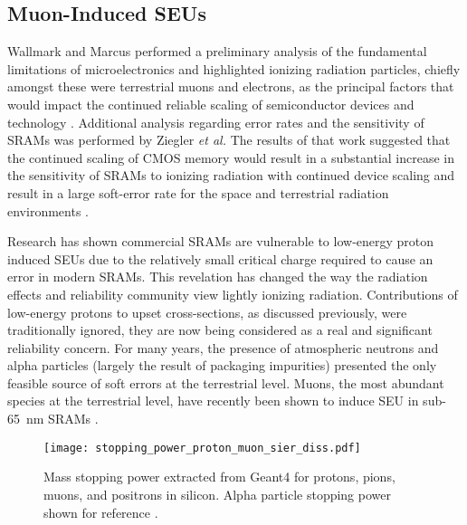 \subsection{Muon-Induced SEUs} %
\label{sub:muon_induced_seus}
Wallmark and Marcus performed a preliminary analysis of the fundamental limitations of microelectronics and highlighted ionizing radiation particles, chiefly amongst these were terrestrial muons and electrons, as the principal factors that would impact the continued reliable scaling of semiconductor devices and technology \cite{Wallmark:1962vn}.
Additional analysis regarding error rates and the sensitivity of SRAMs was performed by Ziegler \emph{et al.}
The results of that work suggested that the continued scaling of CMOS memory would result in a substantial increase in the sensitivity of SRAMs to ionizing radiation with continued device scaling and result in a large soft-error rate for the space and terrestrial radiation environments \cite{Ziegler:1979vh}.

Research has shown commercial SRAMs are vulnerable to low-energy proton induced SEUs due to the relatively small critical charge required to cause an error in modern SRAMs.
This revelation has changed the way the radiation effects and reliability community view lightly ionizing radiation.
Contributions of low-energy protons to upset cross-sections, as discussed previously, were traditionally ignored, they are now being considered as a real and significant reliability concern.
For many years, the presence of atmospheric neutrons and alpha particles (largely the result of packaging impurities) presented the only feasible source of soft errors at the terrestrial level.
Muons, the most abundant species at the terrestrial level, have recently been shown to induce SEU in sub-65~nm SRAMs \cite{Sierawski:2010cj,Sierawski:2011tc,Sierawski:2011bn}.

\begin{figure}[tb]
    \begin{center}
        \texttt{[image: stopping\_power\_proton\_muon\_sier\_diss.pdf]}
    \end{center}
    \caption[Mass stopping power extracted from Geant4 for protons, pions, muons, and positrons in silicon. Alpha particle stopping power shown for reference.]{Mass stopping power extracted from Geant4 for protons, pions, muons, and positrons in silicon. Alpha particle stopping power shown for reference \cite{Sierawski:2011bn}.}
    \label{fig:stopping_power_protons_muons}
\end{figure}

